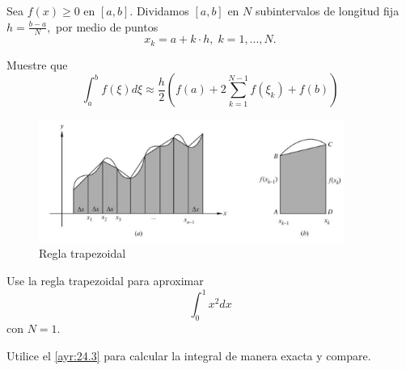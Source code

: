  \begin{resuelto}
  Sea $f(x)\geq 0$ en $[a,b].$ Dividamos $[a,b]$ en $N$ subintervalos de longitud fija $h=\frac{b-a}{N},$ por medio de puntos
  $$x_{k}=a+k\cdot h, \; k=1,...,N.$$


  Muestre que $$
  \int_{a}^{b}f(\xi)d\xi \approx
  \frac{h}{2} \left( f(a)+2\sum_{k=1}^{N-1}f(\xi_{k})+f(b) \right)
  $$
 \end{resuelto}




 \begin{figure}
 \centering
 \includegraphics[width=10cm,keepaspectratio=true]{./calculo/trapezoid.png}
 \caption{Regla trapezoidal}
 \label{fig:ayr:24.2}
\end{figure}





 \begin{resuelto}
  Use la regla trapezoidal para aproximar
  $$
  \int_{0}^{1}x^{2}dx
  $$ con $N=1.$


  Utilice el \eqref{ayr:24.3} para calcular la integral de manera exacta y compare.
 \end{resuelto}


